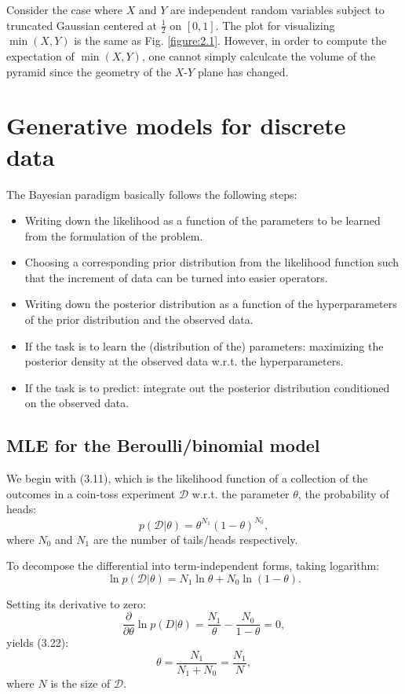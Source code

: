 \documentclass[UTF8]{ctexart}
\begin{document}
Consider the case where $X$ and $Y$ are independent random variables subject to truncated Gaussian centered at $\frac{1}{2}$ on $[0,1]$. 
The plot for visualizing $\min(X,Y)$ is the same as Fig. \ref{figure:2.1}.
However, in order to compute the expectation of $\min(X,Y)$, one cannot simply calculcate the volume of the pyramid since the geometry of the $X$-$Y$ plane has changed. 



\newpage
\section{Generative models for discrete data}
The Bayesian paradigm basically follows the following steps:
\begin{itemize}
\item Writing down the likelihood as a function of the parameters to be learned from the formulation of the problem.
\item Choosing a corresponding prior distribution from the likelihood function such that the increment of data can be turned into easier operators.
\item Writing down the posterior distribution as a function of the hyperparameters of the prior distribution and the observed data.
\item If the task is to learn the (distribution of the) parameters: maximizing the posterior density at the observed data w.r.t. the hyperparameters.
\item If the task is to predict: integrate out the posterior distribution conditioned on the observed data.
\end{itemize}

\subsection{MLE for the Beroulli/binomial model}
We begin with (3.11), which is the likelihood function of a collection of the outcomes in a coin-toss experiment $\mathcal{D}$ w.r.t. the parameter $\theta$, the probability of heads:
$$p(\mathcal{D}|\theta) = \theta^{N_{1}}(1-\theta)^{N_{0}},$$
where $N_{0}$ and $N_{1}$ are the number of tails/heads respectively. 

To decompose the differential into term-independent forms, taking logarithm:
$$\ln p(\mathcal{D}|\theta) = N_{1}\ln \theta + N_{0} \ln (1-\theta).$$

Setting its derivative to zero:
$$\frac{\partial}{\partial \theta} \ln p(D|\theta) = \frac{N_{1}}{\theta} -\frac{N_{0}}{1-\theta}=0,$$
yields (3.22):
$$\theta = \frac{N_{1}}{N_{1}+N_{0}}=\frac{N_{1}}{N},$$
where $N$ is the size of $\mathcal{D}$. 
\end{document}
